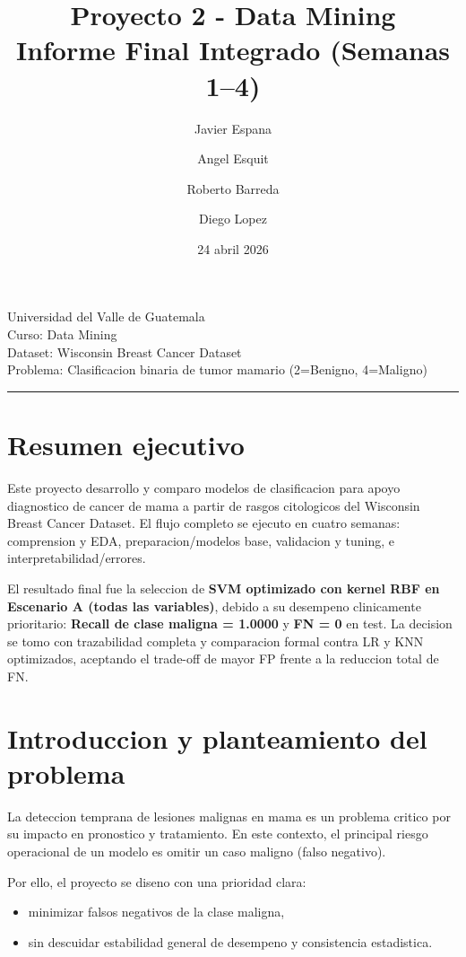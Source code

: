 \documentclass[11pt,a4paper]{article}
\title{Proyecto 2 - Data Mining\\\large Informe Final Integrado (Semanas 1--4)}
\author{Javier Espana \and Angel Esquit \and Roberto Barreda \and Diego Lopez}
\date{24 abril 2026}
\begin{document}
\maketitle

\begin{center}
Universidad del Valle de Guatemala\\
Curso: Data Mining\\
Dataset: Wisconsin Breast Cancer Dataset\\
Problema: Clasificacion binaria de tumor mamario (2=Benigno, 4=Maligno)
\end{center}

\hrule

\section{Resumen ejecutivo}

Este proyecto desarrollo y comparo modelos de clasificacion para apoyo diagnostico de cancer de mama a partir de rasgos citologicos del Wisconsin Breast Cancer Dataset. El flujo completo se ejecuto en cuatro semanas: comprension y EDA, preparacion/modelos base, validacion y tuning, e interpretabilidad/errores.

El resultado final fue la seleccion de \textbf{SVM optimizado con kernel RBF en Escenario A (todas las variables)}, debido a su desempeno clinicamente prioritario: \textbf{Recall de clase maligna = 1.0000} y \textbf{FN = 0} en test. La decision se tomo con trazabilidad completa y comparacion formal contra LR y KNN optimizados, aceptando el trade-off de mayor FP frente a la reduccion total de FN.

\section{Introduccion y planteamiento del problema}

La deteccion temprana de lesiones malignas en mama es un problema critico por su impacto en pronostico y tratamiento. En este contexto, el principal riesgo operacional de un modelo es omitir un caso maligno (falso negativo).

Por ello, el proyecto se diseno con una prioridad clara:

\begin{itemize}[leftmargin=1.2cm]
\item minimizar falsos negativos de la clase maligna,
\item sin descuidar estabilidad general de desempeno y consistencia estadistica.
\end{itemize}
\end{document}
